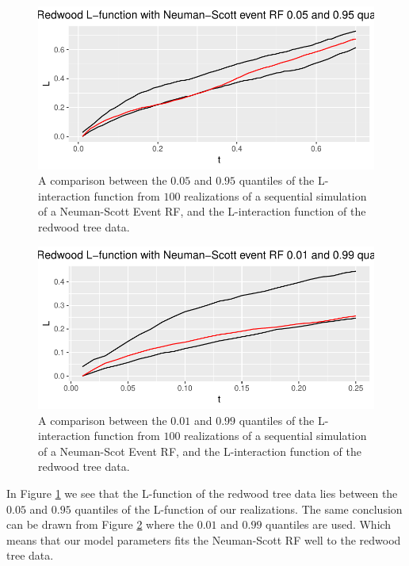 \begin{figure}[H]
    \centering
    \includegraphics[scale=0.95]{figures/ns_quant1.pdf}
    \caption{A comparison between the $0.05$ and $0.95$ quantiles of the L-interaction function from $100$ realizations of a sequential simulation of a Neuman-Scott Event RF, and the L-interaction function of the redwood tree data.}
    \label{fig:ns_quant1}
\end{figure}

\begin{figure}[H]
    \centering
    \includegraphics[scale=0.95]{figures/ns_quant2.pdf}
    \caption{A comparison between the $0.01$ and $0.99$ quantiles of the L-interaction function from $100$ realizations of a sequential simulation of a Neuman-Scot Event RF, and the L-interaction function of the redwood tree data.}
    \label{fig:ns_quant2}
\end{figure}

In Figure \ref{fig:ns_quant1} we see that the L-function of the redwood tree data lies between the $0.05$ and $0.95$ quantiles of the L-function of our realizations. The same conclusion can be drawn from Figure \ref{fig:ns_quant2} where the $0.01$ and $0.99$ quantiles are used. Which means that our model parameters fits the Neuman-Scott RF well to the redwood tree data. 